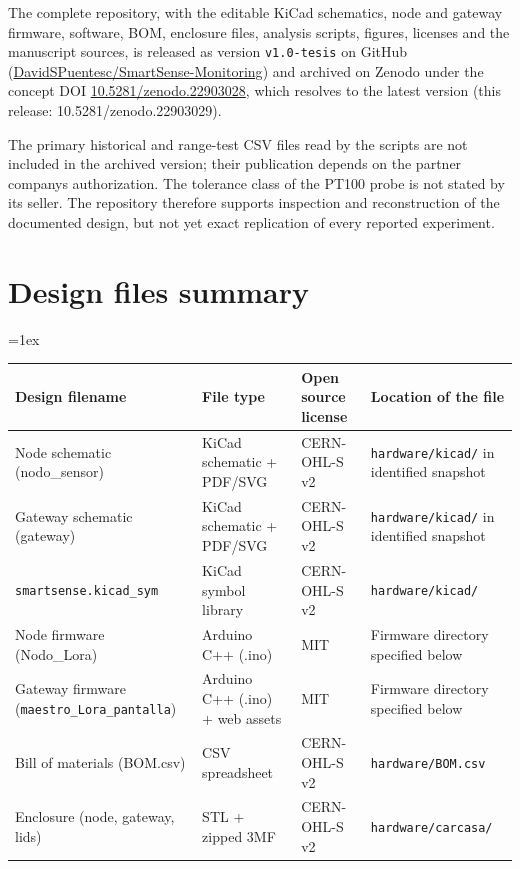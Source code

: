 \documentclass[11pt, letterpaper]{article}
\begin{document}
The complete repository, with the editable KiCad schematics, node and gateway firmware, software, BOM, enclosure files, analysis scripts, figures, licenses and the manuscript sources, is released as version \texttt{v1.0-tesis} on GitHub (\href{https://github.com/DavidSPuentesc/SmartSense-Monitoring}{DavidSPuentesc/SmartSense-Monitoring}) and archived on Zenodo under the concept DOI \href{https://doi.org/10.5281/zenodo.22903028}{10.5281/zenodo.22903028}, which resolves to the latest version (this release: 10.5281/zenodo.22903029).

The primary historical and range-test CSV files read by the scripts are not included in the archived version; their publication depends on the partner company\textquotesingle s authorization. The tolerance class of the PT100 probe is not stated by its seller. The repository therefore supports inspection and reconstruction of the documented design, but not yet exact replication of every reported experiment.

\section{Design files summary}
\vskip 0.1cm
\begingroup\small
\tabulinesep=1ex
\begin{tabu} to \linewidth {|X[1.4,l]|X[1,l]|X[1,l]|X[1.5,l]|}
\hline
\textbf{Design filename} & \textbf{File type} & \textbf{Open source license} & \textbf{Location of the file} \\\hline
Node schematic (nodo\_sensor) & KiCad schematic + PDF/SVG & CERN-OHL-S v2 & \texttt{hardware/kicad/} in identified snapshot \\\hline
Gateway schematic (gateway) & KiCad schematic + PDF/SVG & CERN-OHL-S v2 & \texttt{hardware/kicad/} in identified snapshot \\\hline
\nolinkurl{smartsense.kicad_sym} & KiCad symbol library & CERN-OHL-S v2 & \texttt{hardware/kicad/} \\\hline
Node firmware (Nodo\_Lora) & Arduino C++ (.ino) & MIT & Firmware directory specified below \\\hline
Gateway firmware (\nolinkurl{maestro_Lora_pantalla}) & Arduino C++ (.ino) + web assets & MIT & Firmware directory specified below \\\hline
Bill of materials (BOM.csv) & CSV spreadsheet & CERN-OHL-S v2 & \texttt{hardware/BOM.csv} \\\hline
Enclosure (node, gateway, lids) & STL + zipped 3MF & CERN-OHL-S v2 & \texttt{hardware/carcasa/} \\\hline
\end{tabu}
\endgroup
\end{document}
